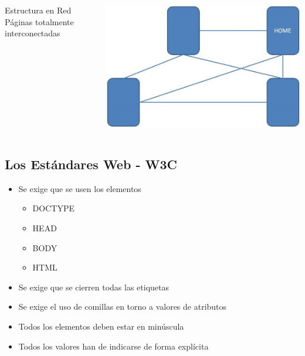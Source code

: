\documentclass{beamer}
\begin{document}
\begin{frame}
  \begin{columns}[c]
	\begin{block}{Estructura en Red}
	Páginas totalmente interconectadas
	\end{block}

	\begin{center}
	\includegraphics[scale=.3]{images/EstructuraRed.JPG} 
	\end{center}
  \end{columns}
\end{frame}

	\subsection{Los Estándares Web - W3C}
\begin{frame}
\begin{itemize}
\item Se exige que se usen los elementos
\pause
	\begin{itemize}
	\item DOCTYPE
	\item HEAD
	\item BODY 
	\item HTML
	\end{itemize}
\pause
\item Se exige que se cierren todas las etiquetas\pause
\item Se exige el uso de comillas en torno a valores de atributos\pause
\item Todos los elementos deben estar en minúscula\pause
\item Todos los valores han de indicarse de forma explícita
\end{itemize}
\end{frame}
\end{document}

